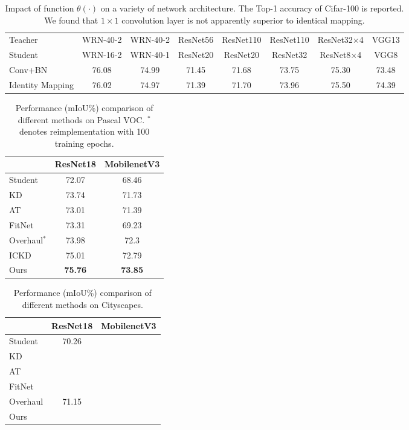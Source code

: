 \documentclass[10pt,twocolumn,letterpaper]{article}
\newcommand{\tablestyle}[2]{\setlength{\tabcolsep}{#1}\renewcommand{\arraystretch}{#2}\centering\footnotesize}
\begin{document}
\begin{table*}[th]
\centering
\caption{Impact of function $\theta(\cdot)$ on a variety of network architecture. The Top-1 accuracy of Cifar-100 is reported. We found that $1\times1$ convolution layer is not apparently superior to identical mapping.}
\resizebox{1.9\columnwidth}{!}
{\tablestyle{20pt}{1.2}
\begin{tabular}{@{}l|ccccccc@{}} 
\toprule
Teacher& WRN-40-2 & WRN-40-2  & ResNet56 & ResNet110 & ResNet110 & ResNet32$\times$4 & VGG13 \\
Student& WRN-16-2 & WRN-40-1  & ResNet20 & ResNet20  & ResNet32  & ResNet8$\times$4  & VGG8 \\ 
\midrule
Conv+BN&76.08&74.99&71.45&71.68&73.75&75.30&73.48\\
Identity Mapping &76.02&74.97&71.39&71.70&73.96&75.50&74.39\\
\bottomrule
\end{tabular}}
\label{tab:cifar_1x1}
\end{table*}

\begin{table}[]
    \centering
    \caption{Performance (mIoU\%) comparison of different methods on Pascal VOC. $^{*}$ denotes reimplementation with 100 training epochs. }
    \begin{tabular}{l|cc}
    \toprule
         &ResNet18 &MobilenetV3   \\
         \hline
        Student &72.07 &68.46     \\
        KD      &73.74 &71.73     \\
        AT      &73.01 &71.39     \\
        FitNet  &73.31 &69.23     \\
        Overhaul$^{*}$&73.98 &72.3     \\
        ICKD    &75.01 &72.79     \\
        Ours    &\textbf{75.76} &\textbf{73.85} \\
    \bottomrule
    \end{tabular}
    \label{tab:seg_voc}
\end{table}

\begin{table}[]
    \centering
    \caption{Performance (mIoU\%) comparison of different methods on Cityscapes. }
    \begin{tabular}{l|cc}
    \toprule
         &ResNet18 &MobilenetV3   \\
         \hline
        Student &70.26 &     \\
        KD      & &     \\
        AT      & &     \\
        FitNet  & &     \\
        Overhaul&71.15 &     \\
        Ours    & & \\
    \bottomrule
    \end{tabular}
    \label{tab:seg_cityscapes}
\end{table}
\end{document}
